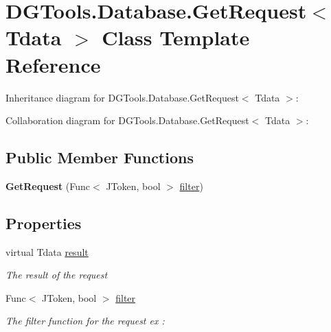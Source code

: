\hypertarget{class_d_g_tools_1_1_database_1_1_get_request}{}\section{D\+G\+Tools.\+Database.\+Get\+Request$<$ Tdata $>$ Class Template Reference}
\label{class_d_g_tools_1_1_database_1_1_get_request}


Inheritance diagram for D\+G\+Tools.\+Database.\+Get\+Request$<$ Tdata $>$\+:


Collaboration diagram for D\+G\+Tools.\+Database.\+Get\+Request$<$ Tdata $>$\+:
\subsection*{Public Member Functions}
\begin{DoxyCompactItemize}
\item 
\mbox{\label{class_d_g_tools_1_1_database_1_1_get_request_a8a2111a7b4b88dfbcba31cc7817f7492}} 
{\bfseries Get\+Request} (Func$<$ J\+Token, bool $>$ \mbox{\hyperlink{class_d_g_tools_1_1_database_1_1_get_request_aeb636422673999df2a0511b1507428cb}{filter}})
\end{DoxyCompactItemize}
\subsection*{Properties}
\begin{DoxyCompactItemize}
\item 
virtual Tdata \mbox{\hyperlink{class_d_g_tools_1_1_database_1_1_get_request_aa8260a07cb7629a784afcc1db7ae48ee}{result}}
\begin{DoxyCompactList}\small\item\em The result of the request \end{DoxyCompactList}\item 
Func$<$ J\+Token, bool $>$ \mbox{\hyperlink{class_d_g_tools_1_1_database_1_1_get_request_aeb636422673999df2a0511b1507428cb}{filter}}
\begin{DoxyCompactList}\small\item\em The filter function for the request ex \+: \end{DoxyCompactList}\end{DoxyCompactItemize}


